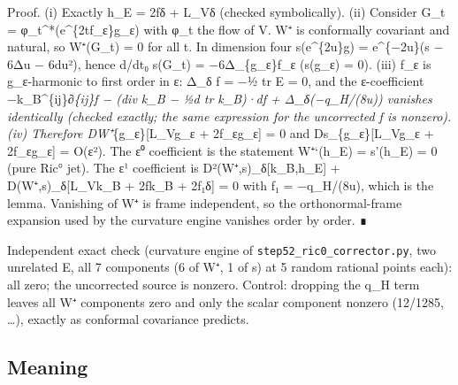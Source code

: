 \documentclass[
  10pt,
]{report}
\begin{document}
Proof. (i) Exactly h\_E = 2fδ + L\_Vδ (checked symbolically). (ii)
Consider G\_t = φ\_t\^{}*(e\^{}\{2tf\_ε\}g\_ε) with φ\_t the flow of V.
W⁺ is conformally covariant and natural, so W⁺(G\_t) = 0 for all t. In
dimension four s(e\^{}\{2u\}g) = e\^{}\{−2u\}(s − 6Δu −
6\textbar du\textbar²), hence d/dt\textbar₀ s(G\_t) = −6Δ\_\{g\_ε\}f\_ε
(s(g\_ε) = 0). (iii) f\_ε is g\_ε-harmonic to first order in ε: Δ\_δ f =
−½ tr E = 0, and the ε-coefficient −k\_B\^{}\{ij\}∂\emph{\{ij\}f − (div
k\_B − ½d tr k\_B)·df + Δ\_δ(−q\_H/(8u)) vanishes identically (checked
exactly; the same expression for the uncorrected f is nonzero). (iv)
Therefore DW⁺}\{g\_ε\}{[}L\_Vg\_ε + 2f\_εg\_ε{]} = 0 and
Ds\_\{g\_ε\}{[}L\_Vg\_ε + 2f\_εg\_ε{]} = O(ε²). The ε⁰ coefficient is
the statement W⁺`(h\_E) = s'(h\_E) = 0 (pure Ric° jet). The ε¹
coefficient is D²(W⁺,s)\_δ{[}k\_B,h\_E{]} + D(W⁺,s)\_δ{[}L\_Vk\_B +
2fk\_B + 2f₁δ{]} = 0 with f₁ = −q\_H/(8u), which is the lemma. Vanishing
of W⁺ is frame independent, so the orthonormal-frame expansion used by
the curvature engine vanishes order by order. ∎

Independent exact check (curvature engine of
\texttt{step52\_ric0\_corrector.py}, two unrelated E, all 7 components
(6 of W⁺, 1 of s) at 5 random rational points each): all zero; the
uncorrected source is nonzero. Control: dropping the q\_H term leaves
all W⁺ components zero and only the scalar component nonzero (12/1285,
\ldots), exactly as conformal covariance predicts.

\hypertarget{meaning}{%
\subsection{Meaning}\label{meaning}}
\end{document}
